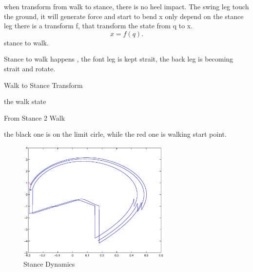 when transform from walk to stance, there is no heel impact.
The swing leg touch the ground, it will generate force and start to bend
x only depend on the stance leg
there is a transform f, that transform the state from q to x.
\[
x=f(q).
\]
stance to walk.

Stance to walk happens , the font leg is kept strait, the back leg is becoming strait and rotate.


Walk to Stance Transform

the walk state


From Stance 2 Walk

the black one is on the limit cirle, while the red one is walking start point.

\begin{figure}[ht]
  \centering
  \includegraphics[width=3in]{images/s2walk.eps}
  \caption{Stance Dynamics}
\end{figure}